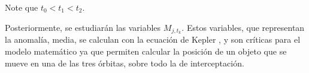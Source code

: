 Note que $t_0 < t_1 < t_2$.

Posteriormente, se estudiarán las variables $M_{j,t_k}$. Estos variables, que representan la anomalía,
media, se calculan con la ecuación de Kepler \parencite{xia2021}, y son críticas para el modelo matemático
ya que permiten calcular la posición de un objeto que se mueve en una de las tres órbitas, sobre todo la de interceptación.